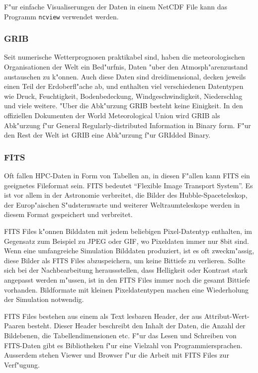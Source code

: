 F"ur einfache Visualiserungen der Daten in einem NetCDF File kann
das Programm {\tt ncview} verwendet werden.

\subsubsection{GRIB}
Seit numerische Wetterprognosen praktikabel sind, haben
die meteorologischen Organisationen der Welt ein Bed"urfnis,
Daten "uber den Atmosph"arenzustand austauschen zu k"onnen.
Auch diese Daten sind dreidimensional, decken jeweils einen Teil
der Erdoberfl"ache ab, und enthalten viel verschiedenen Datentypen
wie Druck, Feuchtigkeit, Bodenbedeckung, Windgeschwindigkeit, Niederschlag
und viele weitere.
"Uber die Abk"urzung GRIB besteht keine Einigkeit.
In den offiziellen Dokumenten der World Meteorological Union wird GRIB
als Abk"urzung f"ur
General Regularly-distributed Information in Binary form. 
F"ur den Rest der Welt ist GRIB eine Abk"urzung f"ur GRIdded Binary.

\subsubsection{FITS}
Oft fallen HPC-Daten in Form von Tabellen an, in diesen F"allen
kann FITS ein geeignetes Fileformat sein. FITS bedeutet ``Flexible
Image Transport System''.
Es ist vor allem in der Astronomie verbreitet, die Bilder des
Hubble-Spaceteleskop, der Europ"aischen S"udsternwarte und weiterer
Weltraumteleskope werden in diesem Format gespeichert und verbreitet.

FITS Files k"onnen Bilddaten mit jedem beliebigen Pixel-Datentyp
enthalten, im Gegensatz zum Beispiel zu JPEG oder GIF, wo Pixeldaten
immer nur 8bit sind. Wenn eine umfangreiche Simulation Bilddaten
produziert, ist es oft zweckm"assig, diese Bilder als FITS Files
abzuspeichern, um keine Bittiefe zu verlieren. Sollte sich bei
der Nachbearbeitung heraussstellen, dass Helligkeit oder Kontrast
stark angepasst werden m"ussen, ist in den FITS Files immer noch die
gesamt Bittiefe vorhanden.
Bildformate mit kleinen Pixeldatentypen machen eine Wiederholung
der Simulation notwendig.

FITS Files bestehen aus einem als Text lesbaren Header, der aus
Attribut-Wert-Paaren besteht.
Dieser Header beschreibt den Inhalt der Daten, die Anzahl der
Bildebenen, die Tabellendimensionen etc.
F"ur das Lesen und Schreiben von FITS-Daten gibt es Bibliotheken
f"ur eine Vielzahl von Programmiersprachen.
Ausserdem stehen Viewer und Browser f"ur die Arbeit mit FITS Files
zur Verf"ugung. 

